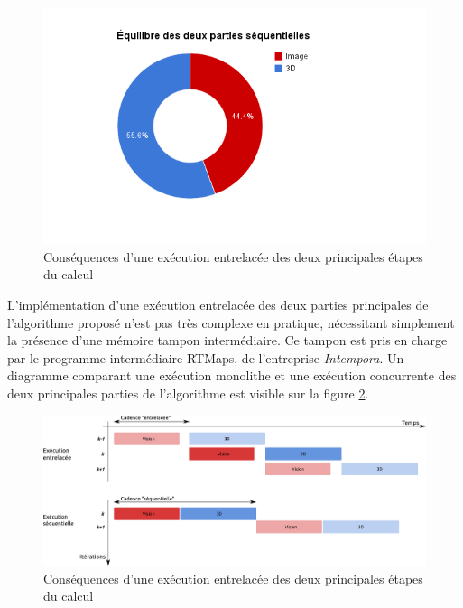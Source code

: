 \begin{figure}
	\centerline {
		\includegraphics[width=1.1\textwidth]{Chapter6/graphics/repartition_image_3D.png}
	}
	\caption{Conséquences d'une exécution entrelacée des deux principales étapes du calcul}
	\label{fig:ch6_image_3D}
\end{figure}

L'implémentation d'une exécution entrelacée des deux parties principales de l'algorithme proposé n'est pas très complexe en pratique, nécessitant simplement la présence d'une mémoire tampon intermédiaire. Ce tampon est pris en charge par le programme intermédiaire RTMaps, de l'entreprise \emph{Intempora}. Un diagramme comparant une exécution monolithe et une exécution concurrente des deux principales parties de l'algorithme est visible sur la figure \ref{fig:ch6_concurrent_execution}.

\begin{figure}
	\centerline {
 	\includegraphics[width=1.1\textwidth]{Chapter6/graphics/concurrent_execution.png}
 	}
 	\caption{Conséquences d'une exécution entrelacée des deux principales étapes du calcul}
	\label{fig:ch6_concurrent_execution}
\end{figure}

